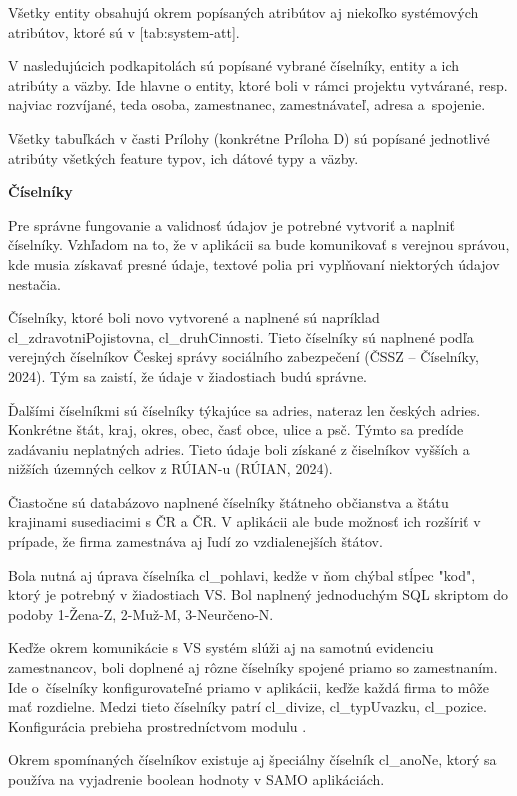 Všetky entity obsahujú okrem popísaných atribútov aj niekoľko systémových atribútov, ktoré sú v [tab:system-att].


V nasledujúcich podkapitolách sú popísané vybrané číselníky, entity a ich atribúty a väzby. Ide hlavne o entity, ktoré boli v rámci projektu vytvárané, resp. najviac rozvíjané, teda osoba, zamestnanec, zamestnávateľ, adresa a~spojenie.

Všetky tabuľkách v časti Prílohy (konkrétne Príloha D) sú popísané jednotlivé atribúty všetkých feature typov, ich dátové typy a väzby.

\blank
\start
\setupindenting[no]
\start\bf Číselníky\stop
\stop

Pre správne fungovanie a validnosť údajov je potrebné vytvoriť a naplniť číselníky. Vzhľadom na to, že v aplikácii sa bude komunikovať s verejnou správou, kde musia získavať presné údaje, textové polia pri vyplňovaní niektorých údajov nestačia. 

Číselníky, ktoré boli novo vytvorené a naplnené sú napríklad cl\_zdravotniPojistovna, cl\_druhCinnosti. Tieto číselníky sú naplnené podľa verejných číselníkov Českej správy sociálního zabezpečení \scr(ČSSZ -- Číselníky, 2024). Tým sa zaistí, že údaje v žiadostiach budú správne. 

Ďalšími číselníkmi sú číselníky týkajúce sa adries, nateraz len českých adries. Konkrétne štát, kraj, okres, obec, časť obce, ulice a psč. Týmto sa predíde zadávaniu neplatných adries. Tieto údaje boli získané z čiselníkov vyšších a nižších územných celkov z RÚIAN-u \scr(RÚIAN, 2024).

Čiastočne sú databázovo naplnené číselníky štátneho občianstva a štátu krajinami susediacimi s ČR a ČR. V aplikácii ale bude možnosť ich rozšíriť v prípade, že firma zamestnáva aj ľudí zo vzdialenejších štátov.

Bola nutná aj úprava číselníka cl\_pohlavi, kedže v ňom chýbal stĺpec "kod", ktorý je potrebný v žiadostiach VS. Bol naplnený jednoduchým SQL skriptom do podoby 1-Žena-Z, 2-Muž-M, 3-Neurčeno-N.

Keďže okrem komunikácie s VS systém slúži aj na samotnú evidenciu zamestnancov, boli doplnené aj rôzne číselníky spojené priamo so zamestnaním. Ide o~číselníky konfigurovateľné priamo v aplikácii, keďže každá firma to môže mať rozdielne. Medzi tieto číselníky patrí cl\_divize, cl\_typUvazku, cl\_pozice. Konfigurácia prebieha prostredníctvom modulu .

Okrem spomínaných číselníkov existuje aj špeciálny číselník cl_anoNe, ktorý sa používa na vyjadrenie boolean hodnoty v SAMO aplikáciách. 

